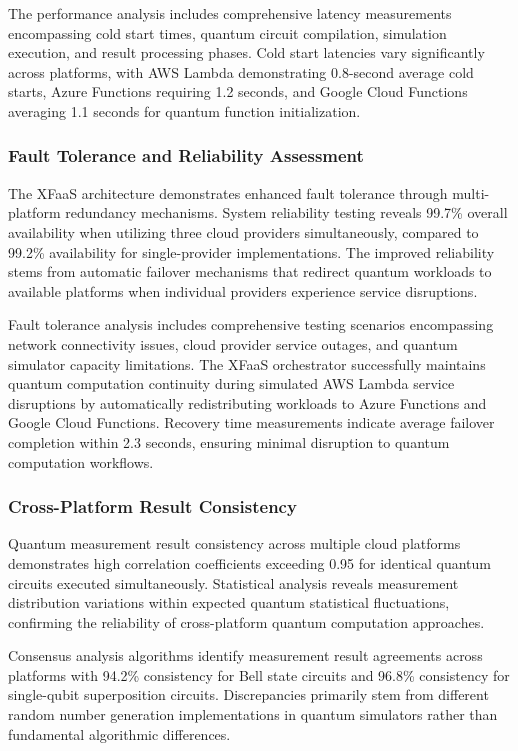 \documentclass[onecolumn]{IEEEtran}
\begin{document}
The performance analysis includes comprehensive latency measurements encompassing cold start times, quantum circuit compilation, simulation execution, and result processing phases. Cold start latencies vary significantly across platforms, with AWS Lambda demonstrating 0.8-second average cold starts, Azure Functions requiring 1.2 seconds, and Google Cloud Functions averaging 1.1 seconds for quantum function initialization.

\subsubsection{Fault Tolerance and Reliability Assessment}

The XFaaS architecture demonstrates enhanced fault tolerance through multi-platform redundancy mechanisms. System reliability testing reveals 99.7\% overall availability when utilizing three cloud providers simultaneously, compared to 99.2\% availability for single-provider implementations. The improved reliability stems from automatic failover mechanisms that redirect quantum workloads to available platforms when individual providers experience service disruptions.

Fault tolerance analysis includes comprehensive testing scenarios encompassing network connectivity issues, cloud provider service outages, and quantum simulator capacity limitations. The XFaaS orchestrator successfully maintains quantum computation continuity during simulated AWS Lambda service disruptions by automatically redistributing workloads to Azure Functions and Google Cloud Functions. Recovery time measurements indicate average failover completion within 2.3 seconds, ensuring minimal disruption to quantum computation workflows.

\subsubsection{Cross-Platform Result Consistency}

Quantum measurement result consistency across multiple cloud platforms demonstrates high correlation coefficients exceeding 0.95 for identical quantum circuits executed simultaneously. Statistical analysis reveals measurement distribution variations within expected quantum statistical fluctuations, confirming the reliability of cross-platform quantum computation approaches.

Consensus analysis algorithms identify measurement result agreements across platforms with 94.2\% consistency for Bell state circuits and 96.8\% consistency for single-qubit superposition circuits. Discrepancies primarily stem from different random number generation implementations in quantum simulators rather than fundamental algorithmic differences.
\end{document}
